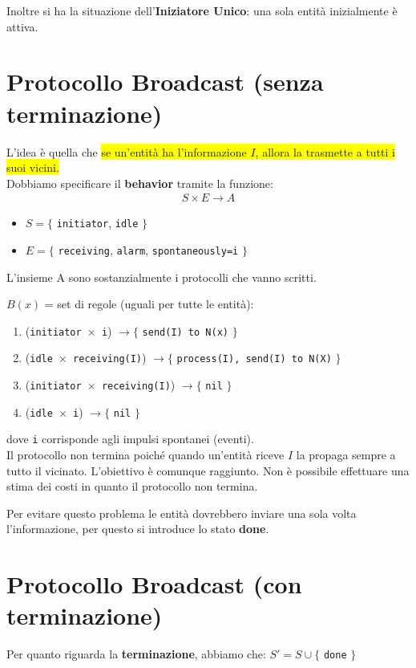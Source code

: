 Inoltre si ha la situazione dell'\textbf{Iniziatore Unico}: una sola entità
inizialmente è attiva.

\section{Protocollo Broadcast (senza terminazione)}
L'idea è quella che \colorbox{yellow}{se un'entità ha l'informazione $I$, allora
    la trasmette a tutti i suoi vicini.} \\ Dobbiamo specificare il
\textbf{behavior} tramite la funzione:
\begin{eqnarray}
    S \times E \rightarrow A
    \nonumber
\end{eqnarray}
\begin{itemize}
    \item $S=\lbrace$ \texttt{initiator}, \texttt{idle} $\rbrace$
    \item $E=\lbrace$ \texttt{receiving}, \texttt{alarm}, \texttt{spontaneously=i}
          $\rbrace$
\end{itemize}

L'insieme A sono sostanzialmente i protocolli che vanno scritti.

$B(x)$ = set di regole (uguali per tutte le entità):
\begin{enumerate}
    \item (\texttt{initiator $\times$ i}) $\rightarrow \lbrace$ \texttt{send(I) to N(x)}
          $\rbrace$
    \item (\texttt{idle $\times$ receiving(I)}) $\rightarrow \lbrace$ \texttt{process(I),
              send(I) to N(X)} $\rbrace$
    \item (\texttt{initiator $\times$ receiving(I)}) $\rightarrow \lbrace$ \texttt{nil}
          $\rbrace$
    \item (\texttt{idle $\times$ i}) $\rightarrow \lbrace$ \texttt{nil} $\rbrace$
\end{enumerate}
dove \texttt{i} corrisponde agli impulsi spontanei (eventi).\\

Il protocollo non termina poiché quando un'entità riceve $I$ la propaga sempre a
tutto il vicinato. L'obiettivo è comunque raggiunto. Non è possibile effettuare
una stima dei costi in quanto il protocollo non termina.

Per evitare questo problema le entità dovrebbero inviare una sola volta
l'informazione, per questo si introduce lo stato \textbf{done}.

\section{Protocollo Broadcast (con terminazione)}
Per quanto riguarda la \textbf{terminazione}, abbiamo che: $S' = S \cup \lbrace$
\texttt{done} $\rbrace$

